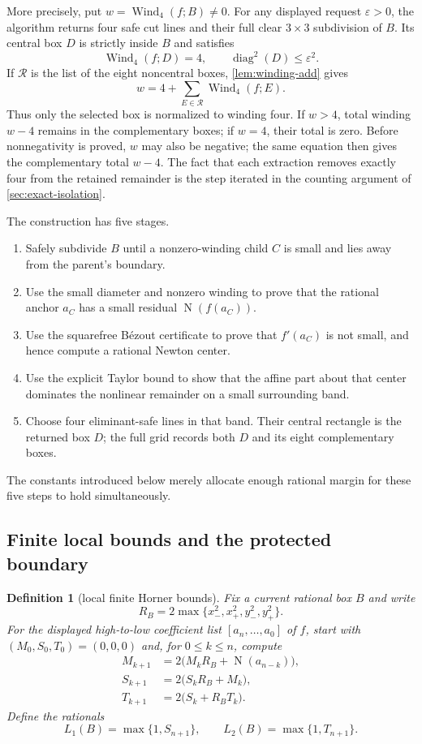 \documentclass[11pt]{article}
\newtheorem{definition}[theorem]{Definition}
\newcommand{\Norm}[1]{\operatorname{N}\!\left(#1\right)}
\newcommand{\Wind}{\operatorname{Wind}}
\newcommand{\diamq}{\operatorname{diag}^{2}}
\newcommand{\eps}{\varepsilon}
\begin{document}
More precisely, put $w=\Wind_4(f;B)\ne0$.  For any displayed request
$\eps>0$, the algorithm returns four safe cut lines and their full clear
$3\times3$ subdivision of $B$.  Its central box $D$ is strictly inside $B$
and satisfies
\[
                 \Wind_4(f;D)=4,
                 \qquad \diamq(D)\le\eps^2.
\]
If $\mathcal R$ is the list of the eight noncentral boxes,
\cref{lem:winding-add} gives
\[
             w=4+\sum_{E\in\mathcal R}\Wind_4(f;E).
\]
Thus only the selected box is normalized to winding four.  If $w>4$, total
winding $w-4$ remains in the complementary boxes; if $w=4$, their total is
zero.  Before nonnegativity is proved, $w$ may also be negative; the same
equation then gives the complementary total $w-4$.  The fact that each
extraction removes exactly four from the retained remainder is the step
iterated in the counting argument of \cref{sec:exact-isolation}.

The construction has five stages.

\begin{enumerate}[label=(\roman*)]
\item Safely subdivide $B$ until a nonzero-winding child $C$ is small and lies
away from the parent's boundary.
\item Use the small diameter and nonzero winding to prove that the rational
anchor $a_C$ has a small residual $\Norm{f(a_C)}$.
\item Use the squarefree Bézout certificate to prove that $f'(a_C)$ is not
small, and hence compute a rational Newton center.
\item Use the explicit Taylor bound to show that the affine part about that
center dominates the nonlinear remainder on a small surrounding band.
\item Choose four eliminant-safe lines in that band.  Their central rectangle
is the returned box $D$; the full grid records both $D$ and its eight
complementary boxes.
\end{enumerate}

The constants introduced below merely allocate enough rational margin for
these five steps to hold simultaneously.

\subsection{Finite local bounds and the protected boundary}

\begin{definition}[local finite Horner bounds]
\label{def:local-horner-bounds}
Fix a current rational box $B$ and write
\[
 R_B=2\max\{x_-^2,x_+^2,y_-^2,y_+^2\}.
\]
For the displayed high-to-low coefficient list
$[a_n,\ldots,a_0]$ of $f$, start with
$(M_0,S_0,T_0)=(0,0,0)$ and, for $0\le k\le n$, compute
\[
\begin{aligned}
 M_{k+1}&=2\bigl(M_kR_B+\Norm{a_{n-k}}\bigr),\\
 S_{k+1}&=2\bigl(S_kR_B+M_k\bigr),\\
 T_{k+1}&=2\bigl(S_k+R_BT_k\bigr).
\end{aligned}
\]
Define the rationals
\[
             L_1(B)=\max\{1,S_{n+1}\},\qquad
             L_2(B)=\max\{1,T_{n+1}\}.
\]
\end{definition}
\end{document}

